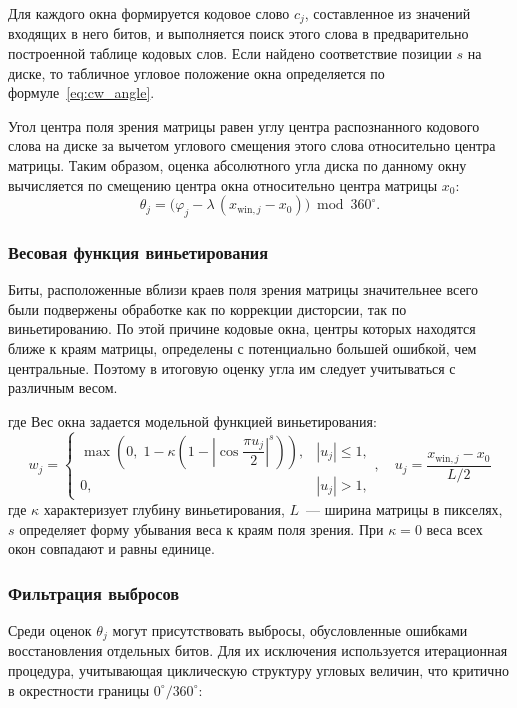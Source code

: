 Для каждого окна формируется кодовое слово $c_j$, составленное из значений входящих в него битов, и выполняется поиск этого слова в предварительно построенной таблице кодовых слов. Если найдено соответствие позиции $s$ на диске, то табличное угловое положение окна определяется по формуле~\eqref{eq:cw_angle}.

Угол центра поля зрения матрицы равен углу центра распознанного кодового слова на диске за вычетом углового смещения этого слова относительно центра матрицы. Таким образом, оценка абсолютного угла диска по данному окну вычисляется по смещению центра окна относительно центра матрицы $x_0$:
\begin{equation*}
    \theta_j = \bigl(\varphi_j - \lambda\,(x_{\mathrm{win},j} - x_0)\bigr) \bmod 360^\circ.
\end{equation*}

\subsubsection{Весовая функция виньетирования}

Биты, расположенные вблизи краев поля зрения матрицы значительнее всего были подвержены обработке как по коррекции дисторсии, так по виньетированию. По этой причине кодовые окна, центры которых находятся ближе к краям матрицы, определены с потенциально большей ошибкой, чем центральные. Поэтому в итоговую оценку угла им следует учитываться с различным весом.


где  Вес окна задается модельной функцией виньетирования:
\begin{equation}
    w_j = \begin{cases}
        \max\!\left(0,\;1 - \kappa\!\left(1 - \left|\cos\!\dfrac{\pi u_j}{2}\right|^s\right)\right), & |u_j| \leq 1,\\[6pt]
        0, & |u_j| > 1,
    \end{cases}, \quad  u_j = \frac{x_{\mathrm{win},j} - x_0}{L/2}
    \label{eq:vign_weight}
\end{equation}
где $\kappa$ характеризует глубину виньетирования, $L$~--- ширина матрицы в пикселях, $s$ определяет форму убывания веса к краям поля зрения. При $\kappa = 0$ веса всех окон совпадают и равны единице.

\subsubsection{Фильтрация выбросов}

Среди оценок $\theta_j$ могут присутствовать выбросы, обусловленные ошибками восстановления отдельных битов. Для их исключения используется итерационная процедура, учитывающая циклическую структуру угловых величин, что критично в окрестности границы $0^\circ/360^\circ$:

